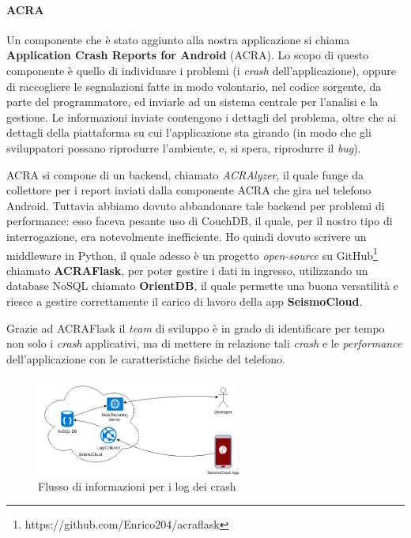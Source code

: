 \documentclass[a4paper,10pt]{memoir}
\begin{document}
\paragraph{ACRA} Un componente che è stato aggiunto alla nostra applicazione si chiama \textbf{Application Crash Reports for Android} (ACRA). Lo scopo di questo componente è quello di individuare i problemi (i \textit{crash} dell'applicazione), oppure di raccogliere le segnalazioni fatte in modo volontario, nel codice sorgente, da parte del programmatore, ed inviarle ad un sistema centrale per l'analisi e la gestione. Le informazioni inviate contengono i dettagli del problema, oltre che ai dettagli della piattaforma su cui l'applicazione sta girando (in modo che gli sviluppatori possano riprodurre l'ambiente, e, si spera, riprodurre il \textit{bug}).

ACRA si compone di un backend, chiamato \textit{ACRAlyzer}, il quale funge da collettore per i report inviati dalla componente ACRA che gira nel telefono Android. Tuttavia abbiamo dovuto abbandonare tale backend per problemi di performance: esso faceva pesante uso di CouchDB, il quale, per il nostro tipo di interrogazione, era notevolmente inefficiente. Ho quindi dovuto scrivere un middleware in Python, il quale adesso è un progetto \textit{open-source} su GitHub\footnote{https://github.com/Enrico204/acraflask} chiamato \textbf{ACRAFlask}, per poter gestire i dati in ingresso, utilizzando un database NoSQL chiamato \textbf{OrientDB}, il quale permette una buona versatilità e riesce a gestire correttamente il carico di lavoro della app \textbf{SeismoCloud}.

Grazie ad ACRAFlask il \textit{team} di sviluppo è in grado di identificare per tempo non solo i \textit{crash} applicativi, ma di mettere in relazione tali \textit{crash} e le \textit{performance} dell'applicazione con le caratteristiche fisiche del telefono.

\begin{figure}[ht]
\centering
\caption{Flusso di informazioni per i log dei crash}
\includegraphics[width=0.6\textwidth]{dev/acracollector}
\end{figure}
\end{document}
